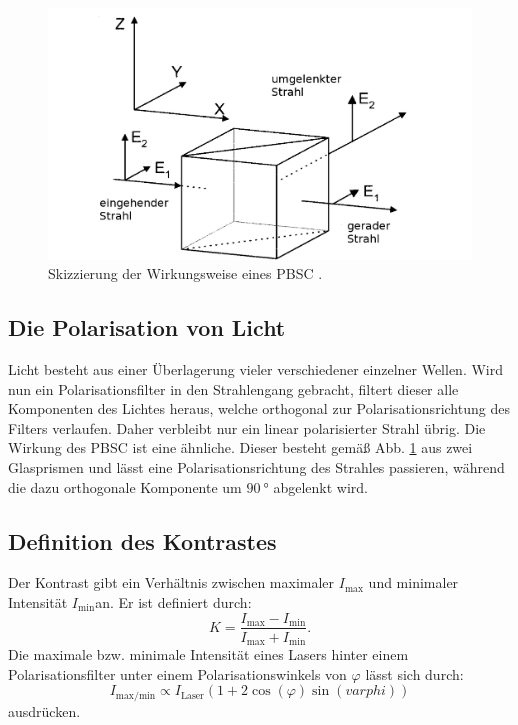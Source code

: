 \begin{figure}
	\centering
	\includegraphics[width=\linewidth-100pt,height=\textheight-100pt,keepaspectratio]{content/Bilder/PBSC.png}
	\caption{Skizzierung der Wirkungsweise eines PBSC \cite{V64}.}
	\label{fig:PBSC}
\end{figure}


\subsection{Die Polarisation von Licht}
Licht besteht aus einer Überlagerung vieler verschiedener einzelner Wellen. Wird nun ein Polarisationsfilter in den Strahlengang gebracht, filtert dieser alle Komponenten des Lichtes heraus, welche orthogonal zur Polarisationsrichtung des Filters verlaufen. Daher verbleibt nur ein linear polarisierter Strahl übrig. Die Wirkung des PBSC ist eine ähnliche. Dieser besteht gemäß Abb. \ref{fig:PBSC} aus zwei Glasprismen und lässt eine Polarisationsrichtung des Strahles passieren, während die dazu orthogonale Komponente um $\SI{90}{\degree}$ abgelenkt wird.

\subsection{Definition des Kontrastes}
Der Kontrast gibt ein Verhältnis zwischen maximaler $I_\text{max}$ und minimaler Intensität $I_\text{min}$an. Er ist definiert durch:
\begin{equation}
    K = \frac{I_\text{max} - I_\text{min}}{I_\text{max} + I_\text{min}} \text{.}          \label{eq:kont}
\end{equation}
Die maximale bzw. minimale Intensität eines Lasers hinter einem Polarisationsfilter unter einem Polarisationswinkels von $\varphi$ lässt sich durch:
\begin{equation}
	I_\text{max/min} \propto I_\text{Laser} \left(  1+ 2 \cos(\varphi) \sin(varphi) \right) \label{eq:kontrast} 
\end{equation}
ausdrücken.